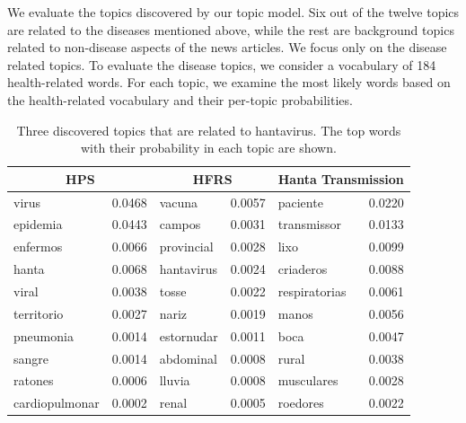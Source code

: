 \documentclass[twoside,leqno,twocolumn]{article}
\begin{document}
We evaluate the topics discovered by our topic model. Six out of the twelve topics are related to the diseases mentioned above, while the rest are background topics related to non-disease aspects of the news articles. We focus only on the disease related topics. To evaluate the disease topics, we consider a vocabulary of 184 health-related words. For each topic, we examine the most likely words based on the health-related vocabulary and their per-topic probabilities.
\begin{table}[t]
\scriptsize \centering
\captionsetup{font=small}
\caption{Three discovered topics that are related to hantavirus. The top words with their probability in each topic are shown.}
\begin{tabular}{|lr|lr|lr|}
\hline
\multicolumn{2}{|c|}{\bf HPS} & \multicolumn{2}{|c|}{\bf HFRS} &
\multicolumn{2}{|c|}{\bf Hanta Transmission} \\ \hline
virus & 0.0468 & vacuna & 0.0057 & paciente & 0.0220 \\
epidemia & 0.0443 & campos & 0.0031 & transmissor & 0.0133 \\
enfermos & 0.0066& provincial & 0.0028  & lixo &0.0099 \\
hanta & 0.0068 & hantavirus & 0.0024  & criaderos & 0.0088\\
viral & 0.0038 & tosse & 0.0022 & respiratorias & 0.0061 \\
territorio & 0.0027 & nariz & 0.0019 & manos & 0.0056 \\
pneumonia & 0.0014 & estornudar & 0.0011 & boca & 0.0047 \\
sangre & 0.0014 & abdominal & 0.0008 & rural & 0.0038 \\
ratones & 0.0006 & lluvia & 0.0008 & musculares & 0.0028 \\
cardiopulmonar & 0.0002 & renal & 0.0005 & roedores & 0.0022 \\
\hline
\end{tabular}
\label{tab:hanta_topics}
\vspace{-10pt}
\end{table}
\end{document}
